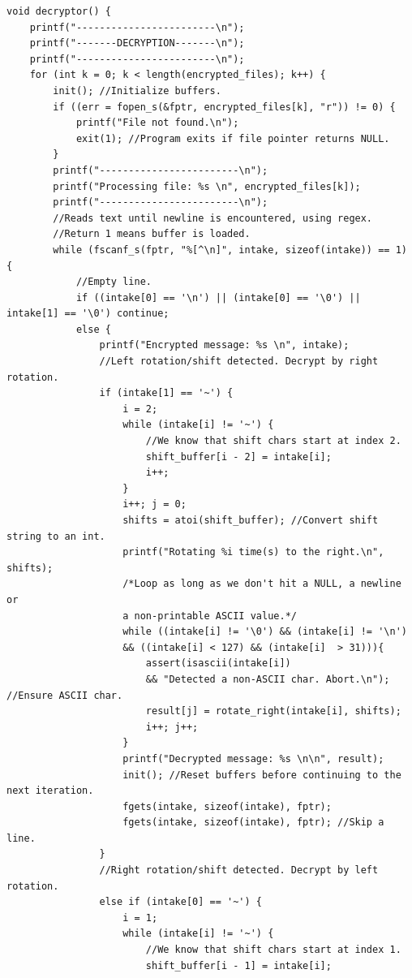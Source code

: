 \documentclass{article}
\begin{document}
\begin{verbatim}
void decryptor() {
    printf("------------------------\n");
    printf("-------DECRYPTION-------\n");
    printf("------------------------\n");
    for (int k = 0; k < length(encrypted_files); k++) {
        init(); //Initialize buffers.
        if ((err = fopen_s(&fptr, encrypted_files[k], "r")) != 0) {
            printf("File not found.\n");
            exit(1); //Program exits if file pointer returns NULL.
        }
        printf("------------------------\n");
        printf("Processing file: %s \n", encrypted_files[k]);
        printf("------------------------\n");
        //Reads text until newline is encountered, using regex.
        //Return 1 means buffer is loaded.
        while (fscanf_s(fptr, "%[^\n]", intake, sizeof(intake)) == 1) {
            //Empty line.
            if ((intake[0] == '\n') || (intake[0] == '\0') || intake[1] == '\0') continue;
            else {
                printf("Encrypted message: %s \n", intake);
                //Left rotation/shift detected. Decrypt by right rotation.
                if (intake[1] == '~') {
                    i = 2;
                    while (intake[i] != '~') {
                        //We know that shift chars start at index 2.
                        shift_buffer[i - 2] = intake[i];
                        i++;
                    }
                    i++; j = 0;
                    shifts = atoi(shift_buffer); //Convert shift string to an int.
                    printf("Rotating %i time(s) to the right.\n", shifts);
                    /*Loop as long as we don't hit a NULL, a newline or
                    a non-printable ASCII value.*/
                    while ((intake[i] != '\0') && (intake[i] != '\n')
                    && ((intake[i] < 127) && (intake[i]  > 31))){
                        assert(isascii(intake[i])
                        && "Detected a non-ASCII char. Abort.\n"); //Ensure ASCII char.
                        result[j] = rotate_right(intake[i], shifts);
                        i++; j++;
                    }
                    printf("Decrypted message: %s \n\n", result);
                    init(); //Reset buffers before continuing to the next iteration.
                    fgets(intake, sizeof(intake), fptr);
                    fgets(intake, sizeof(intake), fptr); //Skip a line.
                }
                //Right rotation/shift detected. Decrypt by left rotation.
                else if (intake[0] == '~') {
                    i = 1;
                    while (intake[i] != '~') {
                        //We know that shift chars start at index 1.
                        shift_buffer[i - 1] = intake[i];

\end{verbatim}
\end{document}
